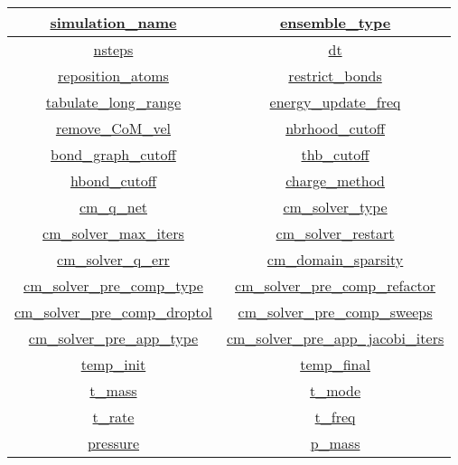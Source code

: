 \documentclass{article}
\begin{document}
\begin{center}
\begin{tabular}{|c|c|} \hline
  \hyperref[sec:simulation_name]{simulation\_name} & \hyperref[sec:ensemble_type]{ensemble\_type} \\ \hline
  \hyperref[sec:nsteps]{nsteps} & \hyperref[sec:dt]{dt} \\ \hline
  \hyperref[sec:reposition_atoms]{reposition\_atoms} & \hyperref[sec:restrict_bonds]{restrict\_bonds} \\ \hline
  \hyperref[sec:tabulate_long_range]{tabulate\_long\_range} & \hyperref[sec:energy_update_freq]{energy\_update\_freq} \\ \hline
  \hyperref[sec:remove_CoM_vel]{remove\_CoM\_vel} & \hyperref[sec:nbrhood_cutoff]{nbrhood\_cutoff} \\ \hline
  \hyperref[sec:bond_graph_cutoff]{bond\_graph\_cutoff} & \hyperref[sec:thb_cutoff]{thb\_cutoff} \\ \hline
  \hyperref[sec:hbond_cutoff]{hbond\_cutoff} & \hyperref[sec:charge_method]{charge\_method} \\ \hline
  \hyperref[sec:cm_q_net]{cm\_q\_net} & \hyperref[sec:cm_solver_type]{cm\_solver\_type} \\ \hline
  \hyperref[sec:cm_solver_max_iters]{cm\_solver\_max\_iters} & \hyperref[sec:cm_solver_restart]{cm\_solver\_restart} \\ \hline
  \hyperref[sec:cm_solver_q_err]{cm\_solver\_q\_err} & \hyperref[sec:cm_domain_sparsity]{cm\_domain\_sparsity} \\ \hline
  \hyperref[sec:cm_solver_pre_comp_type]{cm\_solver\_pre\_comp\_type} & \hyperref[sec:cm_solver_pre_comp_refactor]{cm\_solver\_pre\_comp\_refactor} \\ \hline
  \hyperref[sec:cm_solver_pre_comp_droptol]{cm\_solver\_pre\_comp\_droptol} & \hyperref[sec:cm_solver_pre_comp_sweeps]{cm\_solver\_pre\_comp\_sweeps} \\ \hline
  \hyperref[sec:cm_solver_pre_app_type]{cm\_solver\_pre\_app\_type} & \hyperref[sec:cm_solver_pre_app_jacobi_iters]{cm\_solver\_pre\_app\_jacobi\_iters} \\ \hline
  \hyperref[sec:temp_init]{temp\_init} & \hyperref[sec:temp_final]{temp\_final} \\ \hline
  \hyperref[sec:t_mass]{t\_mass} & \hyperref[sec:t_mode]{t\_mode} \\ \hline
  \hyperref[sec:t_rate]{t\_rate} & \hyperref[sec:t_freq]{t\_freq} \\ \hline
  \hyperref[sec:pressure]{pressure} & \hyperref[sec:p_mass]{p\_mass} \\ \hline

\end{tabular}
\end{center}
\end{document}
